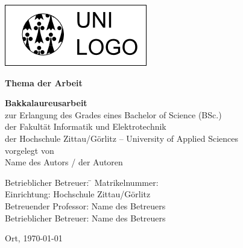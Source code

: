  \begin{titlepage}

	\includegraphics[scale=0.6]{pics/Beispiellogo.png}%

	\vspace{2cm}
      \enlargethispage{3cm}
      \begin{center}
          {\LARGE \textbf{Thema der Arbeit}}
          \vspace{3cm}
          \begin{flushleft}
              {\large \textbf{Bakkalaureusarbeit}}\\[1cm]
              zur Erlangung des Grades eines Bachelor of Science (BSc.)\\
              der Fakult\"{a}t Informatik und Elektrotechnik \\
              der Hochschule Zittau/G\"{o}rlitz -- University of Applied Sciences\\[3cm]

          vorgelegt von \\[1cm]
          {\large Name des Autors / der Autoren} \\
	

          {    \begin{tabbing}

	    
                Betrieblicher Betreuer: \= \kill
		 Matrikelnummer:  \\
				Einrichtung: \> Hochschule Zittau/Görlitz \\
                Betreuender Professor: \> Name des Betreuers\\
                Betrieblicher Betreuer: \> Name des Betreuers\\
            \end{tabbing}}
          \vfill
              Ort, \today
          \end{flushleft}


      \end{center}
      \setcounter{page}{0}
  \end{titlepage}